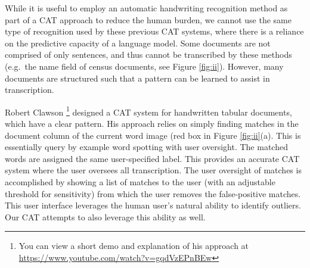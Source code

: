 \documentclass[ms,electronic,twosidetoc,letterpaper,chaptercenter,parttop,lol,lof,lot]{byumsphd}
\begin{document}
While it is useful to employ an automatic handwriting recognition method as part of a CAT approach to reduce the human burden, we cannot use the same type of recognition used by these previous CAT systems, where there is a reliance on the predictive capacity of a language model. Some documents are not comprised of only sentences, and thus cannot be transcribed by these methods (e.g.~the name field of census documents, see Figure \ref{fig:ii}). However, many documents are structured such that a pattern can be learned to assist in transcription.


Robert Clawson \cite{Clawson2014}\footnote{You can view a short demo and explanation of his approach at \url{https://www.youtube.com/watch?v=gqdVzEPnBEw}} designed a CAT system for handwritten tabular documents, which have a clear pattern. His approach relies on simply finding matches in the document column of the current word image (red box in Figure \ref{fig:ii}(a). This is essentially query by example word spotting with user oversight. The matched words are assigned the same user-specified label. This provides an accurate CAT system where the user oversees all transcription. The user oversight of matches is accomplished by showing a list of matches to the user (with an adjustable threshold for sensitivity) from which the user removes the false-positive matches. This user interface leverages the human user's natural ability to identify outliers.
Our CAT attempts to also leverage this ability as well.
\end{document}
